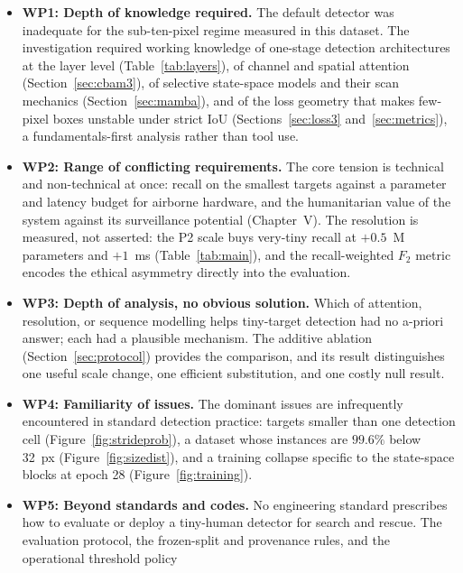 \documentclass[12pt,a4paper,oneside]{report}
\begin{document}
\begin{itemize}
  \item \textbf{WP1: Depth of knowledge required.} The default detector was
        inadequate for the sub-ten-pixel regime measured in this dataset. The
        investigation required working knowledge of one-stage detection
        architectures at the layer level (Table~\ref{tab:layers}), of
        channel and spatial attention (Section~\ref{sec:cbam3}), of selective
        state-space models and their scan mechanics (Section~\ref{sec:mamba}), and of
        the loss geometry that makes few-pixel boxes unstable under strict
        IoU (Sections~\ref{sec:loss3} and~\ref{sec:metrics}), a fundamentals-first analysis rather
        than tool use.
  \item \textbf{WP2: Range of conflicting requirements.} The core tension is
        technical and non-technical at once: recall on the smallest targets
        against a parameter and latency budget for airborne hardware, and
        the humanitarian value of the system against its surveillance
        potential (Chapter~V). The resolution is measured, not asserted: the
        P2 scale buys very-tiny recall at $+0.5$~M parameters and $+1$~ms
        (Table~\ref{tab:main}), and the recall-weighted $F_2$ metric encodes
        the ethical asymmetry directly into the evaluation.
  \item \textbf{WP3: Depth of analysis, no obvious solution.} Which of
        attention, resolution, or sequence modelling helps tiny-target
        detection had no a-priori answer; each had a plausible mechanism. The
        additive ablation (Section~\ref{sec:protocol}) provides the comparison,
        and its result distinguishes one useful scale change, one efficient
        substitution, and one costly null result.
  \item \textbf{WP4: Familiarity of issues.} The dominant issues are
        infrequently encountered in standard detection practice: targets
        smaller than one detection cell (Figure~\ref{fig:strideprob}), a
        dataset whose instances are $99.6\%$ below 32~px
        (Figure~\ref{fig:sizedist}), and a training collapse specific to
        the state-space blocks at epoch 28 (Figure~\ref{fig:training}).
  \item \textbf{WP5: Beyond standards and codes.} No engineering standard
        prescribes how to evaluate or deploy a tiny-human detector for
        search and rescue. The evaluation protocol, the frozen-split and
        provenance rules, and the operational threshold policy

\end{itemize}
\end{document}
